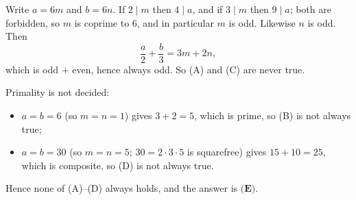 Write $a=6m$ and $b=6n$. If $2\mid m$ then $4\mid a$, and if $3\mid m$ then $9\mid a$; both are forbidden, so $m$ is coprime to $6$, and in particular $m$ is odd. Likewise $n$ is odd. Then
\[
\dfrac{a}{2}+\dfrac{b}{3}=3m+2n,
\]
which is odd $+$ even, hence always odd. So (A) and (C) are never true.

Primality is not decided:
\begin{itemize}
\item $a=b=6$ (so $m=n=1$) gives $3+2=5$, which is prime, so (B) is not always true;
\item $a=b=30$ (so $m=n=5$; $30=2\cdot3\cdot5$ is squarefree) gives $15+10=25$, which is composite, so (D) is not always true.
\end{itemize}
Hence none of (A)--(D) always holds, and the answer is $\boxed{\textbf{(E)}}$.
